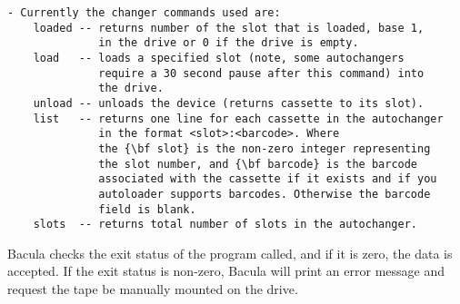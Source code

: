 \footnotesize
\begin{verbatim}
- Currently the changer commands used are:
    loaded -- returns number of the slot that is loaded, base 1,
              in the drive or 0 if the drive is empty.
    load   -- loads a specified slot (note, some autochangers
              require a 30 second pause after this command) into
              the drive.
    unload -- unloads the device (returns cassette to its slot).
    list   -- returns one line for each cassette in the autochanger
              in the format <slot>:<barcode>. Where
              the {\bf slot} is the non-zero integer representing
              the slot number, and {\bf barcode} is the barcode
              associated with the cassette if it exists and if you
              autoloader supports barcodes. Otherwise the barcode
              field is blank.
    slots  -- returns total number of slots in the autochanger.
\end{verbatim}
\normalsize

Bacula checks the exit status of the program called, and if it is zero, the
data is accepted. If the exit status is non-zero, Bacula will print an
error message and request the tape be manually mounted on the drive.
